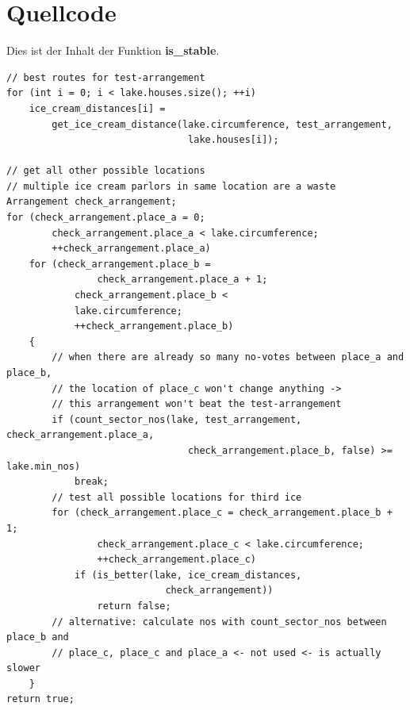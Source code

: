 \documentclass[a4paper,10pt,ngerman,captions=figureheading]{scrartcl}
\begin{document}
\section{Quellcode}
Dies ist der Inhalt der Funktion \textbf{is\_stable}.
\begin{lstlisting}
// best routes for test-arrangement
for (int i = 0; i < lake.houses.size(); ++i)
    ice_cream_distances[i] =
        get_ice_cream_distance(lake.circumference, test_arrangement,
                                lake.houses[i]);

// get all other possible locations
// multiple ice cream parlors in same location are a waste
Arrangement check_arrangement;
for (check_arrangement.place_a = 0;
        check_arrangement.place_a < lake.circumference;
        ++check_arrangement.place_a)
    for (check_arrangement.place_b =
                check_arrangement.place_a + 1;
            check_arrangement.place_b <
            lake.circumference;
            ++check_arrangement.place_b)
    {
        // when there are already so many no-votes between place_a and place_b,
        // the location of place_c won't change anything ->
        // this arrangement won't beat the test-arrangement
        if (count_sector_nos(lake, test_arrangement, check_arrangement.place_a,
                                check_arrangement.place_b, false) >= lake.min_nos)
            break;
        // test all possible locations for third ice
        for (check_arrangement.place_c = check_arrangement.place_b + 1;
                check_arrangement.place_c < lake.circumference;
                ++check_arrangement.place_c)
            if (is_better(lake, ice_cream_distances,
                            check_arrangement))
                return false;
        // alternative: calculate nos with count_sector_nos between place_b and
        // place_c, place_c and place_a <- not used <- is actually slower
    }
return true;
\end{lstlisting}
\end{document}

